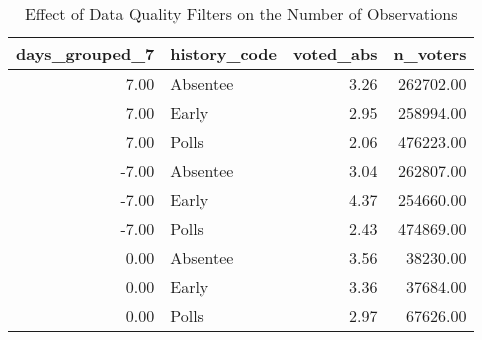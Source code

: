 \begin{table}[!htb]
\centering
\caption{Effect of Data Quality Filters on the Number of Observations} 
\label{table:tab11}
\begingroup\small
\begin{tabular}{rlrr}
  \hline
days_grouped_7 & history_code & voted_abs & n_voters \\ 
  \hline
7.00 & Absentee & 3.26 & 262702.00 \\ 
  7.00 & Early & 2.95 & 258994.00 \\ 
  7.00 & Polls & 2.06 & 476223.00 \\ 
  -7.00 & Absentee & 3.04 & 262807.00 \\ 
  -7.00 & Early & 4.37 & 254660.00 \\ 
  -7.00 & Polls & 2.43 & 474869.00 \\ 
  0.00 & Absentee & 3.56 & 38230.00 \\ 
  0.00 & Early & 3.36 & 37684.00 \\ 
  0.00 & Polls & 2.97 & 67626.00 \\ 
   \hline
\end{tabular}
\endgroup
\end{table}
